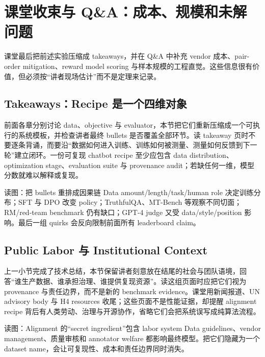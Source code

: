 \section{课堂收束与 Q\&A：成本、规模和未解问题}

课堂最后把前述实验压缩成 takeaways，并在 Q\&A 中补充 vendor 成本、pair-order mitigation、reward model scoring 与样本规模的工程直觉。这些信息很有价值，但必须按“讲者现场估计”而不是定理来记录。

\subsection{Takeaways：Recipe 是一个四维对象}

前面各章分别讨论 data、objective 与 evaluator，本节把它们重新压缩成一个可执行的系统模板，并检查讲者最终 bullets 是否覆盖全部环节。读 takeaway 页时不要逐条背诵，而要沿“数据如何进入训练、训练如何被测量、测量如何反馈到下一轮”建立闭环。一份可复现 chatbot recipe 至少应包含 data distribution、optimization stage、evaluation suite 与 provenance audit；若缺任何一维，模型分数就难以解释或复现。


\begin{knowledgebox}{读图：把 bullets 重排成因果链}
Data amount/length/task/human role 决定训练分布；SFT 与 DPO 改变 policy；TruthfulQA、MT-Bench 等观察不同切面；RM/red-team benchmark 仍有缺口；GPT-4 judge 又受 data/style/position 影响。最后一组 quirks 会反向限制前面所有 leaderboard claim。
\end{knowledgebox}

\subsection{Public Labor 与 Institutional Context}

上一小节完成了技术总结，本节保留讲者刻意放在结尾的社会与团队语境，回答“谁生产数据、谁承担治理、谁提供复现资源”。读这组页面时应把它们视为 provenance 与责任边界，而不是新的 benchmark evidence。课堂用新闻报道、UN advisory body 与 H4 resources 收尾；这些页面不是性能证据，却提醒 alignment recipe 背后有人类劳动、治理与开源协作，省略它们会把系统误写成纯算法流程。


\begin{knowledgebox}{读图：Alignment 的“secret ingredient”包含 labor system}
Data guidelines、vendor management、质量审核和 annotator welfare 都影响最终模型。把它们隐藏为一个 dataset name，会让可复现性、成本和责任边界同时消失。
\end{knowledgebox}

